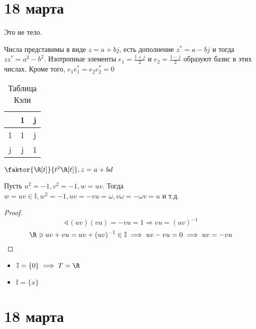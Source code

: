 \chapter{18 марта}

\begin{example}
	Это не тело.

	Числа представимы в виде \(z = a + bj\), есть дополнение \(z^* = a - bj\) и тогда \(zz^* = a^2 - b^2\). Изотропные элементы \(e_1 = \frac{1+j}{2}\) и \(e_2 = \frac{1-j}{2}\) образуют базис в этих числах. Кроме того, \(e_1 e_1^* = e_2 e_2^* = 0\)
	\begin{table}[h]
		\caption{Таблица Кэли}
		\centering
		\begin{tabular}{C|C|C}
			  & 1 & j \\  & 1 & j \\ \hline
			j & j & 1 \\
		\end{tabular}
	\end{table}
\end{example}

\begin{example}
	\(\faktor{\R[t]}{t^2 \R[t]}, z = a + bd\)
\end{example}

\begin{lemma}
	Пусть \(u^2 = - 1, v^2 =- 1, w = uv\). Тогда \(w = uv \in \mathbb{I}, w^2 =- 1, uv = -vu = \omega, v \omega = - \omega v = u\) и т.д.
\end{lemma}
\begin{proof}
	\[\sphericalangle (uv)(vu) = - vu = 1 \Rightarrow vu = (uv)^{-1}\]
	\[\R \ni uv + vu = uv + (uv)^{-1} \in \mathbb{I} \implies uv - vu = 0 \implies uv = -vu\]
\end{proof}

\begin{theorem}\itemfix
	\begin{itemize}
		\item \(\mathbb{I} = \{0\} \implies T = \R\)
		\item \(\mathbb{I} = \{x\}\)
	\end{itemize}
\end{theorem}


\chapter{18 марта}

